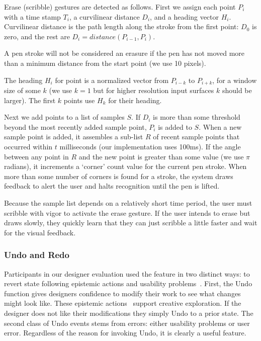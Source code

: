\documentclass{article}
\begin{document}
Erase (scribble) gestures are detected as follows. First we assign
each point $P_i$ with a time stamp $T_i$, a curvilinear distance
$D_i$, and a heading vector $H_i$. Curvilinear distance is the path
length along the stroke from the first point: $D_0$ is zero, and the
rest are $D_i = distance(P_{i-1}, P_i)$.

A pen stroke will not be considered an erasure if the pen has not
moved more than a minimum distance from the start point (we use 10
pixels).

The heading $H_i$ for point is a normalized vector from $P_{i-k}$ to
$P_{i+k}$, for a window size of some $k$ (we use $k=1$ but for higher
resolution input surfaces $k$ should be larger). The first $k$ points
use $H_k$ for their heading.

Next we add points to a list of samples $S$. If $D_i$ is more than
some threshold beyond the most recently added sample point, $P_i$ is
added to $S$. When a new sample point is added, it assembles a
sub-list $R$ of recent sample points that occurred within $t$
milliseconds (our implementation uses 100ms). If the angle between any
point in $R$ and the new point is greater than some value (we use
$\pi$ radians), it increments a `corner' count value for the current
pen stroke. When more than some number of corners is found for a
stroke, the system draws feedback to alert the user and halts
recognition until the pen is lifted.

Because the sample list depends on a relatively short time period, the
user must scribble with vigor to activate the erase gesture. If the
user intends to erase but draws slowly, they quickly learn that they
can just scribble a little faster and wait for the visual feedback.

\subsubsection{Undo and Redo}

Participants in our designer evaluation used the feature in two
distinct ways: to revert state following epistemic actions and
usability problems~\cite{akers-undo}. First, the Undo function gives
designers confidence to modify their work to see what changes might
look like. These epistemic actions~\cite{kirsch-epistemic-action}
support creative exploration. If the designer does not like their
modifications they simply Undo to a prior state. The second class of
Undo events stems from errors: either usability problems or user
error. Regardless of the reason for invoking Undo, it is clearly a
useful feature. 
\end{document}

